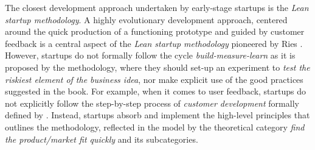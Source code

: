 \documentclass[10pt,journal,letterpaper,compsoc]{IEEEtran}
\begin{document}
\begin{compactitem}
\item The closest development approach undertaken by early-stage startups is 
the \textit{Lean startup methodology}.  A highly evolutionary development 
approach, centered around the quick production of a functioning prototype and 
guided by customer feedback is a central aspect of the \textit{Lean startup 
methodology} pioneered by Ries \cite{Ries2011}. However, startups do not 
formally follow the cycle \textit{build-measure-learn} as it is proposed by the 
methodology, where they should set-up an experiment to \textit{test the riskiest 
element of the business idea}, nor make explicit use of the good practices 
suggested in the book. For example, when it comes to user feedback, startups do 
not explicitly follow the step-by-step process of \textit{customer development} 
formally defined by \cite{Blank2005}. Instead, startups absorb and implement 
the high-level principles that outlines the methodology, reflected in the model 
by the theoretical category \textit{find the product/market fit quickly} and 
its subcategories.


\end{compactitem}
\end{document}
